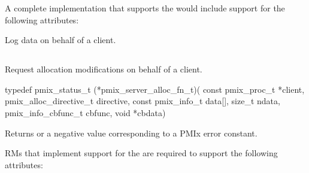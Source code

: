 
\optattr
A complete implementation that supports the  would include support for the following attributes:


\descr

Log data on behalf of a client.


\subsection{}

\summary

Request allocation modifications on behalf of a client.

\format

\cspecificstart
\begin{codepar}
typedef pmix_status_t (*pmix_server_alloc_fn_t)(
                             const pmix_proc_t *client,
                             pmix_alloc_directive_t directive,
                             const pmix_info_t data[], size_t ndata,
                             pmix_info_cbfunc_t cbfunc, void *cbdata)
\end{codepar}
\cspecificend

\begin{arglist}
\end{arglist}

Returns  or a negative value corresponding to a PMIx error constant.

\reqattr
\acp{RM} that implement support for the  are required to support the following attributes:


